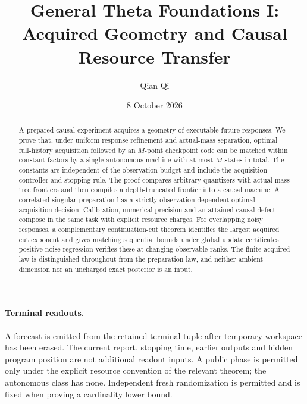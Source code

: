 \documentclass[11pt]{amsart}
\title{General Theta Foundations I:\\Acquired Geometry and Causal Resource Transfer}
\author{Qian Qi}
\date{8 October 2026}
\theoremstyle{definition}
\theoremstyle{remark}
\begin{document}
\begin{abstract}
A prepared causal experiment acquires a geometry of executable future responses. We prove that, under uniform response refinement and actual-mass separation, optimal full-history acquisition followed by an $M$-point checkpoint code can be matched within constant factors by a single autonomous machine with at most $M$ states in total. The constants are independent of the observation budget and include the acquisition controller and stopping rule. The proof compares arbitrary quantizers with actual-mass tree frontiers and then compiles a depth-truncated frontier into a causal machine. A correlated singular preparation has a strictly observation-dependent optimal acquisition decision. Calibration, numerical precision and an attained causal defect compose in the same task with explicit resource charges. For overlapping noisy responses, a complementary continuation-cut theorem identifies the largest acquired cut exponent and gives matching sequential bounds under global update certificates; positive-noise regression verifies these at changing observable ranks. The finite acquired law is distinguished throughout from the preparation law, and neither ambient dimension nor an uncharged exact posterior is an input.
\end{abstract}
\maketitle

\paragraph{Terminal readouts.} A forecast is emitted from the retained terminal tuple after temporary workspace has been erased. The current report, stopping time, earlier outputs and hidden program position are not additional readout inputs. A public phase is permitted only under the explicit resource convention of the relevant theorem; the autonomous class has none. Independent fresh randomization is permitted and is fixed when proving a cardinality lower bound.












\appendix


\end{document}
